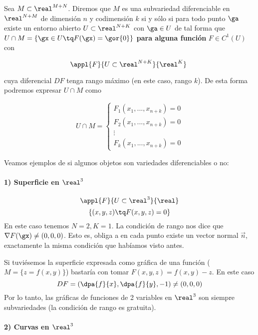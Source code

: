   \begin{defn}\label{defSubDif}
  Sea $M \subset \real^{M+N}$. Diremos que $M$ es una subvariedad diferenciable en $\real^{N+M}$ de dimensión $n$ y codimensión $k$ si y sólo si para todo punto $\ga$ existe un entorno abierto $U \subset \real^{N+K}$ con $\ga \in U$ de tal forma que $U \cap M = \{\gx\in U\tq F(\gx) = \gor{0}\}$ \textbf{para alguna función} $F\in C^1(U)$ con 
  
  \[\appl{F}{U\subset \real^{N+K}}{\real^K} \]
  
  cuya diferencial $DF$ tenga rango máximo (en este caso, rango $k$). De esta forma podremos expresar $U\cap M$ como 
  
  \[U\cap M = \left\{\begin{array}{cc}
                     F_1(x_1,...,x_{n+k}) = 0\\
                     F_2(x_1,...,x_{n+k}) = 0\\
                     \vdots\\
                     F_k(x_1,...,x_{n+k}) = 0
                    \end{array}\right.\] 
                    
  \end{defn}
  

Veamos ejemplos de si algunos objetos son variedades diferenciables o no:
\paragraph{1) Superficie en $\real^3$} 
  \[\appl{F}{U\subset\real^3}{\real}\]
  \[\{(x,y,z) \tq F(x,y,z) = 0\}\]
  En este caso tenemos $N=2, K=1$.
  La condición de rango nos dice que $\nabla F(\gx) \neq (0,0,0)$. Esto es, obliga a en cada punto existe un vector normal $\overrightarrow{n}$, exactamente la misma condición que habíamos visto antes.
  
  \begin{remark} Si tuviésemos la superficie expresada como gráfica de una función ($M = \{z = f(x,y)\}$) bastaría con tomar $F(x,y,z) = f(x,y)-z$. En este caso
  \[DF = \left(\dpa{f}{x},\dpa{f}{y},-1\right) \neq (0,0,0)\]
  Por lo tanto, las gráficas de funciones de 2 variables en $\real^3$ son siempre subvariedades (la condición de rango es gratuita).
  \end{remark}
  
\paragraph{2)  Curvas en $\real^3$}
  
